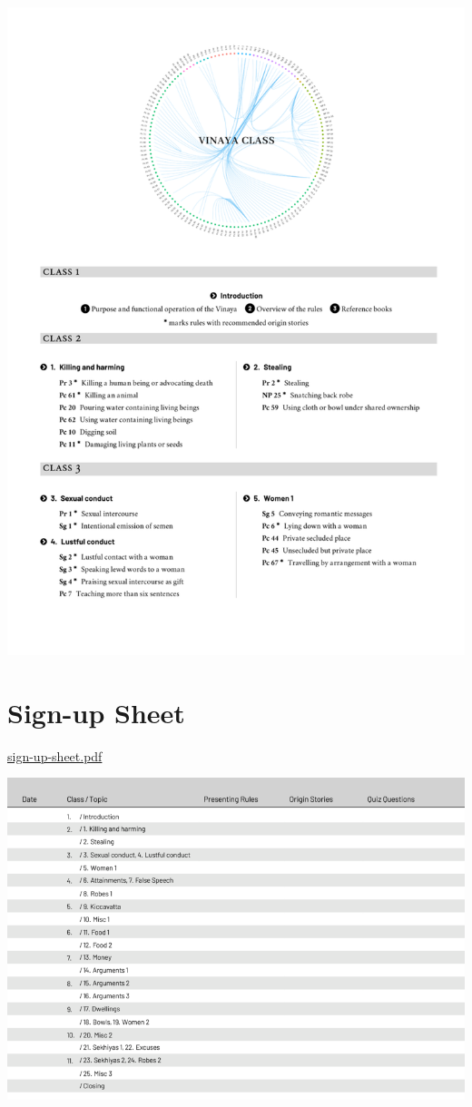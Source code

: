 \href{./includes/docs/schedule.pdf}{\includegraphics{./includes/docs/schedule-thumb.png}}

\section{Sign-up Sheet}

\href{./includes/docs/sign-up-sheet.pdf}{sign-up-sheet.pdf}

\href{./includes/docs/sign-up-sheet.pdf}{\includegraphics{./includes/docs/sign-up-sheet-thumb.png}}

